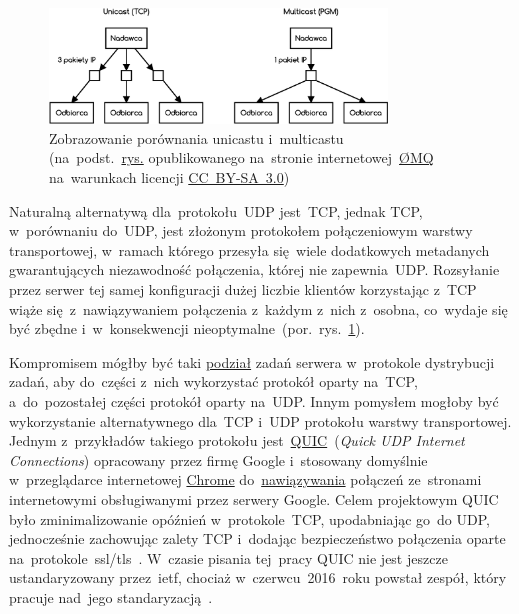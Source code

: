 \documentclass[thesis]{subfiles}
\begin{document}
\begin{figure}
	\centering
	\includegraphics[width=0.8\textwidth]{img/unicast-vs-multicast}
	\caption[Zobrazowanie porównania unicastu i~multicastu]{Zobrazowanie porównania unicastu i~multicastu\\(na~podst.~\href{http://zeromq.wdfiles.com/local--files/whitepapers\%3Adesign-v05/pgm2.png}{rys.} opublikowanego na~stronie internetowej~\href{http://zeromq.org/}{ØMQ} na~warunkach licencji  \href{https://creativecommons.org/licenses/by-sa/3.0/}{CC~BY-SA~3.0})}
	\label{fig:unicast-vs-multicast}
\end{figure}

Naturalną alternatywą dla~protokołu~UDP jest~TCP, jednak TCP, w~porównaniu do~UDP, jest złożonym protokołem połączeniowym warstwy transportowej, w~ramach którego przesyła się~wiele dodatkowych metadanych gwarantujących niezawodność połączenia, której nie zapewnia~UDP. Rozsyłanie przez serwer tej samej konfiguracji dużej liczbie klientów korzystając z~TCP wiąże się~z~nawiązywaniem połączenia z~każdym z~nich z~osobna, co~wydaje się być zbędne i~w~konsekwencji nieoptymalne~(por.~rys.~\ref{fig:unicast-vs-multicast}).

Kompromisem mógłby być taki \hyperlink{server-role}{podział} zadań serwera w~protokole dystrybucji zadań, aby do~części z~nich wykorzystać protokół oparty na~TCP, a~do~pozostałej części protokół oparty na~UDP. Innym pomysłem mogłoby być wykorzystanie alternatywnego dla~TCP i~UDP protokołu warstwy transportowej. Jednym z~przykładów takiego protokołu jest~\href{https://en.wikipedia.org/wiki/QUIC}{QUIC}~(\emph{Quick UDP Internet Connections}) opracowany przez firmę Google i~stosowany domyślnie w~przeglądarce internetowej \href{https://www.google.pl/chrome/}{Chrome} do~\href{https://cs.chromium.org/chromium/src/net/tools/quic/quic_server.cc}{nawiązywania} połączeń ze~stronami internetowymi obsługiwanymi przez serwery Google. Celem projektowym QUIC było zminimalizowanie opóźnień w~protokole~TCP, upodabniając go~do UDP, jednocześnie zachowując zalety TCP i~dodając bezpieczeństwo połączenia oparte na~protokole~\gls{ssl/tls}~\cite{quic-wire-layout-spec,quic-crypto,quic-roskind}. W~czasie pisania tej~pracy QUIC nie jest jeszcze ustandaryzowany przez~\gls{ietf}, chociaż w~czerwcu~2016~roku powstał zespół, który pracuje nad~jego standaryzacją~\cite{quic-draft,quic-workinggroup}.
\end{document}
